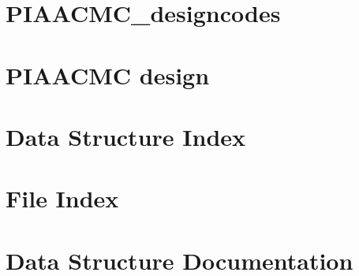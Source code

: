 \documentclass[twoside]{book}
\newcommand{\+}{\discretionary{\mbox{\scriptsize$\hookleftarrow$}}{}{}}
\begin{document}
\chapter{P\+I\+A\+A\+C\+M\+C\+\_\+designcodes}
\label{md_src_PIAACMCsimul_PIAACMC_designcodes}
\hypertarget{md_src_PIAACMCsimul_PIAACMC_designcodes}{}

\chapter{P\+I\+A\+A\+C\+M\+C design}
\label{md_src_PIAACMCsimul_README}
\hypertarget{md_src_PIAACMCsimul_README}{}

\chapter{Data Structure Index}

\chapter{File Index}

\chapter{Data Structure Documentation}






























\end{document}
